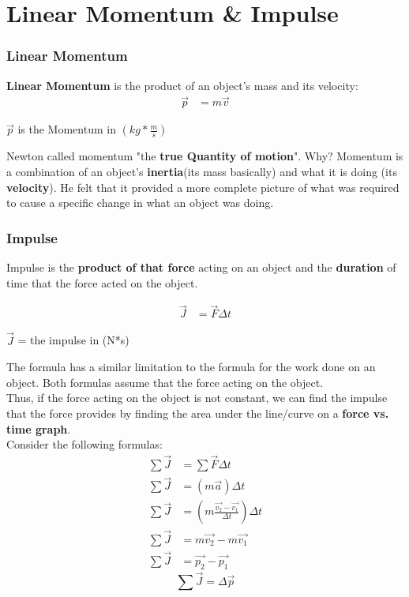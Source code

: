\section{Linear Momentum \& Impulse}
\subsubsection{Linear Momentum}
\textbf{Linear Momentum} is the product of an object's mass and its velocity:
\begin{align*}
    \vec{p} &= m\vec{v}
\end{align*}
\begin{center}
    $\vec{p}$ is the Momentum in $(kg * \frac{m}{s})$
\end{center}

Newton called momentum "the \textbf{true Quantity of motion}". Why? Momentum is a combination of an object's 
\textbf{inertia}(its mass basically) and what it is doing (its \textbf{velocity}). He felt that it provided a 
more complete picture of what was required to cause a specific change in what an object was doing. 

\subsubsection{Impulse}
Impulse is the \textbf{product of that force} acting on an object and the \textbf{duration} of time that the 
force acted on the object. 

\begin{align*}
    \vec{J} &= \vec{F}\Delta t
\end{align*}
\begin{center}
    $\vec{J}$ = the impulse in (N*s)
\end{center}

The formula has a similar limitation to the formula for the work done on an object. Both formulas assume that the
force acting on the object. \\

Thus, if the force acting on the object is not constant, we can find the impulse that the force provides by 
finding the area under the line/curve on a \textbf{force vs. time graph}.\\

Consider the following formulas:
\begin{align*}
    \sum \vec{J} &= \sum \vec{F}\Delta t\\
    \sum \vec{J} &= (m\vec{a})\Delta t\\
    \sum \vec{J} &= \left(m\frac{\vec{v_2} - \vec{v_1}}{\Delta t}\right)\Delta t\\
    \sum \vec{J} &= m\vec{v_2} - m\vec{v_1}\\
    \sum \vec{J} &= \vec{p_2} - \vec{p_1}
\end{align*}
\begin{equation}
    \sum \vec{J} = \Delta \vec{p}
\end{equation}
